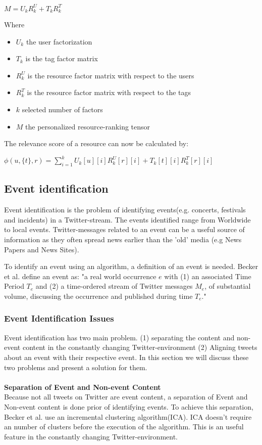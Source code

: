 \documentclass{article}
\begin{document}
\begin{enumerate}
$M = U_k R_k^U + T_k R_k^T$

Where 
\begin{itemize}
 \item $U_k$ the user factorization
 \item $T_k$ is the tag factor matrix
 \item $R_k^U$ is the resource factor matrix with respect to the users
 \item $R_k^T$ is the resource factor matrix with respect to the tags
 \item $k$ selected number of factors
 \item $M$ the personalized resource-ranking tensor
\end{itemize}

The relevance score of a resource can now be calculated by:

$\phi (u, \{t\}, r) = \sum_{i=1}^k U_k[u][i]R_k^U[r][i] + T_k[t][i]R_k^T[r][i]$	
\end{enumerate}


\subsection{Event identification}

Event identification is the problem of identifying events(e.g. concerts, festivals and incidents) in a Twitter-stream. The events identified range from Worldwide to local events. Twitter-messages related to an event can be a useful source of information as they often spread news earlier than the 'old' media (e.g News Papers and News Sites).

To identify an event using an algorithm, a definition of an event is needed. Becker et al.  define an event as: "a real world occurrence $e$ with (1) an associated Time Period $T_e$ and (2) a time-ordered stream of Twitter messages $M_e$, of substantial volume, discussing the occurrence and published during time $T_e$." \cite{eventident} 

\subsubsection*{Event Identification Issues}
Event identification has two main problem. (1) separating the content and non-event content in the constantly changing 
Twitter-environment (2) Aligning tweets about an event with their respective event. In this section we will discuss these two problems and present a solution for them.
\\\\ 
\textbf{Separation of Event and Non-event Content}\\
Because not all tweets on Twitter are event content, a separation of Event and Non-event content is done prior of identifying events. To achieve this separation, Becker et al.  use an incremental clustering algorithm(ICA). ICA doesn't require an number of clusters before the execution of the algorithm. This is an useful feature in the constantly changing Twitter-environment. \cite{eventident} 
\end{document}
